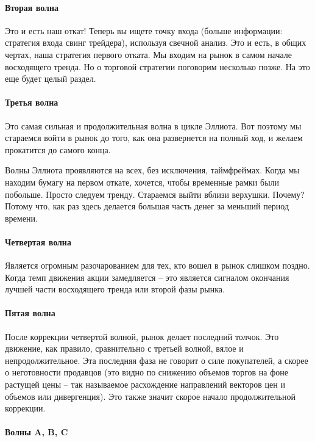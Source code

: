 \documentclass{book}
\begin{document}
\paragraph{Вторая волна }

Это и есть наш откат! Теперь вы ищете точку входа (больше информации:
стратегия входа свинг трейдера), используя свечной анализ. Это и есть,
в общих чертах, наша стратегия первого отката. Мы входим на рынок в
самом начале восходящего тренда. Но о торговой стратегии поговорим
несколько позже. На это еще будет целый раздел.

\paragraph{Третья волна}

Это самая сильная и продолжительная волна в цикле Эллиота. Вот поэтому мы стараемся войти в рынок до того, как она развернется на полный ход, и желаем прокатится до самого конца.

Волны Эллиота проявляются на всех, без исключения, таймфреймах. Когда
мы находим бумагу на первом откате, хочется, чтобы временные рамки
были побольше. Просто следуем тренду. Стараемся выйти вблизи
верхушки. Почему? Потому что, как раз здесь делается большая часть
денег за меньший период времени.

\paragraph{Четвертая волна}

Является огромным разочарованием для тех, кто вошел в рынок слишком
поздно. Когда темп движения акции замедляется – это является сигналом
окончания лучшей части восходящего тренда или второй фазы рынка.

\paragraph{Пятая волна }

После коррекции четвертой волной, рынок делает последний толчок. Это
движение, как правило, сравнительно с третьей волной, вялое и
непродолжительное. Эта последняя фаза не говорит о силе покупателей, а
скорее о неготовности продавцов (это видно по снижению объемов торгов
на фоне растущей цены – так называемое расхождение направлений
векторов цен и объемов или дивергенция). Это также значит скорое
начало продолжительной коррекции.

\paragraph{Волны A, B, C}
\end{document}
